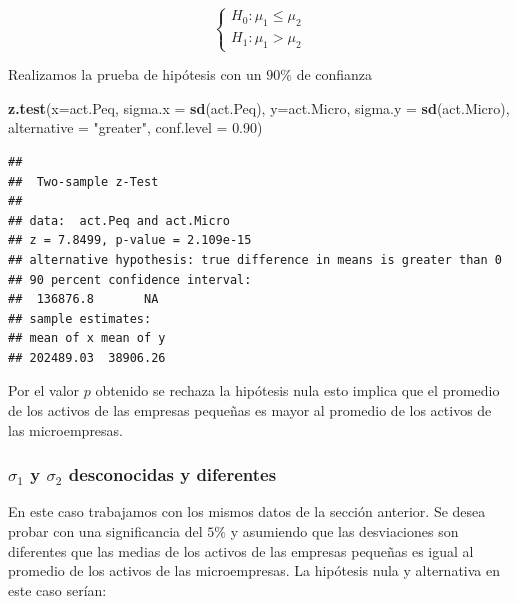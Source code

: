 \documentclass[letterpaper,]{book}
\newenvironment{Shaded}{\begin{snugshade}}{\end{snugshade}}
\newcommand{\DataTypeTok}[1]{\textcolor[rgb]{0.13,0.29,0.53}{#1}}
\newcommand{\FloatTok}[1]{\textcolor[rgb]{0.00,0.00,0.81}{#1}}
\newcommand{\KeywordTok}[1]{\textcolor[rgb]{0.13,0.29,0.53}{\textbf{#1}}}
\newcommand{\NormalTok}[1]{#1}
\newcommand{\StringTok}[1]{\textcolor[rgb]{0.31,0.60,0.02}{#1}}
\begin{document}
\begin{equation} 
\begin{cases} 
H_0: \mu_1 \leq \mu_2 \\ 
H_1: \mu_1 > \mu_2
\end{cases} 
\end{equation}

Realizamos la prueba de hipótesis con un \(90\%\) de confianza

\begin{Shaded}
\begin{Highlighting}[]
\KeywordTok{z.test}\NormalTok{(}\DataTypeTok{x=}\NormalTok{act.Peq, }\DataTypeTok{sigma.x =} \KeywordTok{sd}\NormalTok{(act.Peq), }
       \DataTypeTok{y=}\NormalTok{act.Micro, }\DataTypeTok{sigma.y =} \KeywordTok{sd}\NormalTok{(act.Micro),}
       \DataTypeTok{alternative =} \StringTok{"greater"}\NormalTok{, }\DataTypeTok{conf.level =} \FloatTok{0.90}\NormalTok{)}
\end{Highlighting}
\end{Shaded}

\begin{verbatim}
## 
##  Two-sample z-Test
## 
## data:  act.Peq and act.Micro
## z = 7.8499, p-value = 2.109e-15
## alternative hypothesis: true difference in means is greater than 0
## 90 percent confidence interval:
##  136876.8       NA
## sample estimates:
## mean of x mean of y 
## 202489.03  38906.26
\end{verbatim}

Por el valor \(p\) obtenido se rechaza la hipótesis nula esto implica que el promedio de los activos de las empresas pequeñas es mayor al promedio de los activos de las microempresas.

\hypertarget{sigma_1-y-sigma_2-desconocidas-y-diferentes}{%
\subsubsection{\texorpdfstring{\(\sigma_1\) y \(\sigma_2\) desconocidas y diferentes}{\textbackslash{}sigma\_1 y \textbackslash{}sigma\_2 desconocidas y diferentes}}\label{sigma_1-y-sigma_2-desconocidas-y-diferentes}}

En este caso trabajamos con los mismos datos de la sección anterior. Se desea probar con una significancia del \(5\%\) y asumiendo que las desviaciones son diferentes que las medias de los activos de las empresas pequeñas es igual al promedio de los activos de las microempresas. La hipótesis nula y alternativa en este caso serían:
\end{document}
